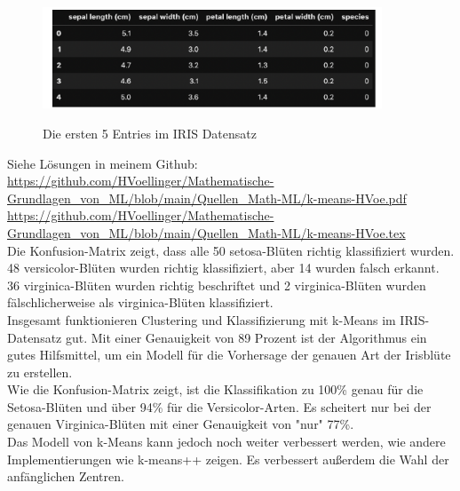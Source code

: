 \documentclass[12pt]{article}
\begin{document}
\begin{figure}[htp]
  \centering
  \hspace*{-0.1cm} 
  \includegraphics[width=0.9\textwidth]{IRIS-Dataset-First_Entries}\\
  \caption{Die ersten 5 Entries im IRIS Datensatz}
  \label{fig:Iris_DS}
\end{figure}
%
Siehe Lösungen in meinem Github:\\ 
%
\url{https://github.com/HVoellinger/Mathematische-Grundlagen_von_ML/blob/main/Quellen_Math-ML/k-means-HVoe.pdf} \\
%
\url{https://github.com/HVoellinger/Mathematische-Grundlagen_von_ML/blob/main/Quellen_Math-ML/k-means-HVoe.tex}\\[0.3cm]
%
Die Konfusion-Matrix zeigt, dass alle 50 setosa-Blüten richtig klassifiziert wurden.\\ 48 versicolor-Blüten wurden richtig klassifiziert, aber 14 wurden falsch erkannt. \\ 36 virginica-Blüten wurden richtig beschriftet und 2 virginica-Blüten wurden fälschlicherweise als virginica-Blüten klassifiziert.\\[0.2cm]
%
Insgesamt funktionieren  Clustering und Klassifizierung mit k-Means im IRIS-Datensatz gut. Mit einer Genauigkeit von 89 Prozent ist der Algorithmus ein gutes Hilfsmittel, um ein Modell für die Vorhersage der genauen Art der Irisblüte zu erstellen.\\
Wie die Konfusion-Matrix zeigt, ist die Klassifikation zu 100\% genau
für die Setosa-Blüten und über 94\% für die Versicolor-Arten. Es scheitert nur bei der genauen Virginica-Blüten mit einer Genauigkeit von "nur" 77\%.\\
Das Modell von k-Means kann jedoch noch weiter verbessert werden, wie andere  Implementierungen wie k-means++ zeigen. Es verbessert außerdem die Wahl der anfänglichen Zentren.

\newpage

{\color{red}{***********************************************************************\\ 
Ab hier bis Ende der Übungen sind die Folien der Vorlesung ML  zu nutzen und diese sind in Latex umzusetzen...\\
************************************************************************}}\\[0.2cm]
\end{document}
